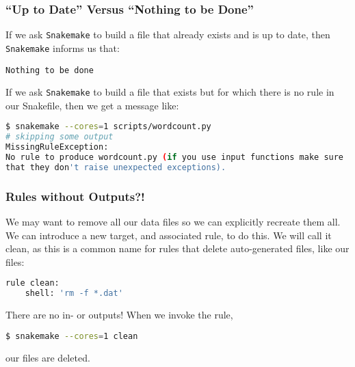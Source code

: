 \begin{frame}[fragile]
  \frametitle{``Up to Date'' Versus ``Nothing to be Done''}
  If we ask \texttt{Snakemake} to build a file that already exists and is up to date, then \texttt{Snakemake} informs us that:
  \begin{lstlisting}[style=Plain]
Nothing to be done
  \end{lstlisting}
  \pause
  If we ask \texttt{Snakemake} to build a file that exists but for which there is no rule in our Snakefile, then we get a message like:
  \begin{lstlisting}[language=Bash, style=Shell, basicstyle=\footnotesize]
$ snakemake --cores=1 scripts/wordcount.py
# skipping some output
MissingRuleException:
No rule to produce wordcount.py (if you use input functions make sure
that they don't raise unexpected exceptions).
  \end{lstlisting}
\end{frame}

\begin{frame}[fragile]
  \frametitle{Rules without Outputs?!}
  We may want to remove all our data files so we can explicitly recreate them all. We can introduce a new target, and associated rule, to do this. We will call it clean, as this is a common name for rules that delete auto-generated files, like our  files:
  \begin{lstlisting}[language=Python,style=Python]
rule clean:
    shell: 'rm -f *.dat'
  \end{lstlisting}
  There are no in- or outputs! When we invoke the rule, 
  \begin{lstlisting}[language=Bash, style=Shell]
$ snakemake --cores=1 clean
  \end{lstlisting}
  our   files are deleted.
\end{frame}

